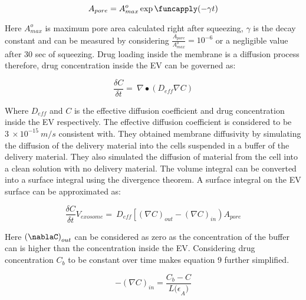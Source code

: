 \vspace{0.5cm}
\begin{equation}\label{eq:7}
A_{pore} = A_{max}^o\exp\funcapply(-\gamma t)
\end{equation}
\vspace{0.5cm}

Here $A_{max}^o$ is maximum pore area calculated right after squeezing, $\gamma$ is the decay constant and can be measured by considering $\frac{A_{pore}}{A_{max}^o}={10}^{-6}$ or a negligible value after 30 sec of squeezing. Drug loading inside the membrane is a diffusion process therefore, drug concentration inside the EV can be governed as:

\vspace{0.5cm}
\begin{equation}\label{eq:8}
\frac{\delta C}{\delta t}=\ \nabla\bullet(D_{eff}\nabla C)
\end{equation}
\vspace{0.5cm}

Where $D_{eff}$ and $C$ is the effective diffusion coefficient and drug concentration inside the EV respectively. The effective diffusion coefficient is considered to be $3\ \times{10}^{-15}\ m/s$ consistent with\cite{a64}. They obtained membrane diffusivity by simulating the diffusion of the delivery material into the cells suspended in a buffer of the delivery material. They also simulated the diffusion of material from the cell into a clean solution with no delivery material. The volume integral can be converted into a surface integral using the divergence theorem. A surface integral on the EV surface can be approximated as:

\vspace{0.5cm}
\begin{equation}\label{eq:9}
\frac{\delta C}{\delta t}V_{exosome}=\ D_{eff}\left[\left(\nabla C\right)_{out}-\left(\nabla C\right)_{in}\right)A_{pore}
\end{equation}
\vspace{0.5cm}

Here $\left(\nablaC\right)_{out}$ can be considered as zero as the concentration of the buffer can is higher than the concentration inside the EV. Considering drug concentration $C_b$ to be constant over time makes equation 9 further simplified.

\vspace{0.5cm}
\begin{equation}\label{eq:10}
-\left(\nabla C\right)_{in}=\frac{C_b-C}{L{(\epsilon}_A)} 
\end{equation}
\vspace{0.5cm}

